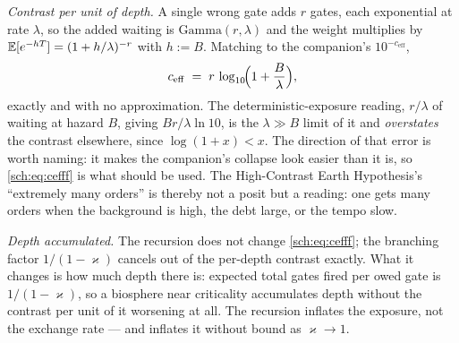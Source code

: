 \emph{Contrast per unit of depth.} A single wrong gate adds $r$ gates,
each exponential at rate $\lambda$, so the added waiting is
$\mathrm{Gamma}(r,\lambda)$ and the weight multiplies by
$\mathbb{E}[e^{-hT}]=(1+h/\lambda)^{-r}$ with $h:=B$. Matching to the
companion's $10^{-c_{\mathrm{eff}}}$,
\begin{equation}\label{sch:eq:cefff}
c_{\mathrm{eff}}\;=\;r\,\log_{10}\!\Bigl(1+\frac{B}{\lambda}\Bigr),
\end{equation}
exactly and with no approximation. The deterministic-exposure reading, $r/\lambda$ of waiting at hazard $B$, giving
$Br/\lambda\ln10$, is the $\lambda\gg B$ limit of it
and \emph{overstates} the contrast elsewhere, since $\log(1+x)<x$. The
direction of that error is worth naming: it makes the companion's
collapse look easier than it is, so \eqref{sch:eq:cefff} is what should
be used. The High-Contrast Earth
Hypothesis's ``extremely many orders'' is thereby not a posit but a
reading: one gets many orders when the background is high, the debt
large, or the tempo slow.

\emph{Depth accumulated.} The recursion does not change
\eqref{sch:eq:cefff}; the branching factor $1/(1-\varkappa)$ cancels out of the
per-depth contrast exactly. What it changes is how much depth there is:
expected total gates fired per owed gate is $1/(1-\varkappa)$, so a biosphere
near criticality accumulates depth without the contrast per unit of it
worsening at all. The recursion inflates the exposure, not the exchange
rate --- and inflates it without bound as $\varkappa\to1$.

